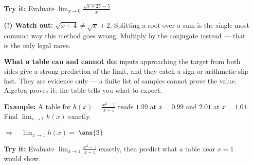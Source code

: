 \documentclass[12pt]{article}
\begin{document}
\begin{tryitbox}
\textbf{Try it:} \quad Evaluate $\displaystyle\lim_{x \to 0} \frac{\sqrt{x+25}-5}{x}$\\[2pt]
\end{tryitbox}

\begin{watchoutbox}
\textbf{(!) Watch out:} $\sqrt{x+4} \neq \sqrt{x}+2$. Splitting a root over a sum
is the single most common way this method goes wrong. Multiply by the conjugate
instead --- that is the only legal move.
\end{watchoutbox}


\begin{formulabox}
\textbf{What a table can and cannot do:} inputs approaching the target from both
sides give a strong prediction of the limit, and they catch a sign or arithmetic
slip fast. They are evidence only --- a finite list of samples cannot prove the
value. Algebra proves it; the table tells you what to expect.
\end{formulabox}

\begin{examplebox}
\textbf{Example:} \quad A table for $h(x)=\frac{x^2-1}{x-1}$ reads $1.99$ at
$x=0.99$ and $2.01$ at $x=1.01$. Find $\displaystyle\lim_{x \to 1} h(x)$ exactly.

$\Rightarrow\quad \lim_{x \to 1} h(x) = $ $\ans{2}$
\end{examplebox}

\begin{tryitbox}
\textbf{Try it:} \quad Evaluate $\displaystyle\lim_{x \to 1} \frac{x^3-1}{x-1}$
exactly, then predict what a table near $x=1$ would show.\\[2pt]
\end{tryitbox}
\end{document}
